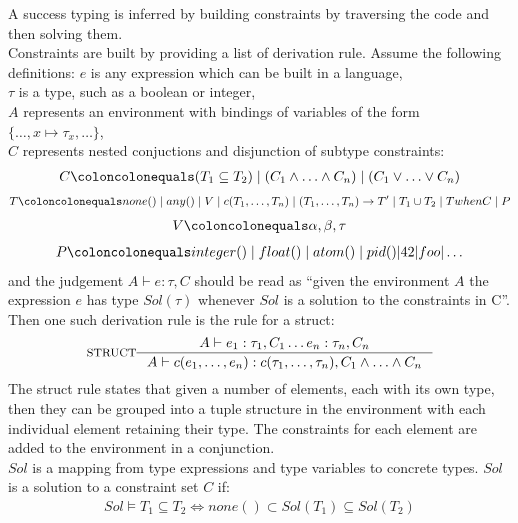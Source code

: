 \documentclass[12pt, titlepage]{article}
\begin{document}
A success typing is inferred by building constraints by traversing the code and then solving them. \\
Constraints are built by providing a list of derivation rule. Assume the following definitions:
$e$ is any expression which can be built in a language, \\
$\tau$ is a type, such as a boolean or integer, \\
$A$ represents an environment with bindings of variables of the form $\{\ldots, x \mapsto \tau_x, \ldots\}$, \\
$C$ represents nested conjuctions and disjunction of subtype constraints:
\begin{align*} 
	C \coloncolonequals (T_1 \subseteq T_2) \mid (C_1 \land \ldots \land C_n) \mid (C_1 \lor \ldots \lor C_n)
\end{align*}
\begin{align*} 
	T \coloncolonequals none() \mid any() \mid V \mid c(T_1, \ldots, T_n) \mid (T_1, \ldots, T_n) \rightarrow T'\mid T_1 \cup T_2 \mid T when C \mid P
\end{align*}
\begin{align*} 
	V \coloncolonequals \alpha, \beta, \tau
\end{align*}
\begin{align*} 
	P \coloncolonequals integer() \mid float() \mid atom() \mid pid()| 42 | foo | \ldots
\end{align*}
and the judgement $A \vdash e : \tau, C$ should be read as ``given the environment $A$ the expression $e$ has type $Sol(\tau)$ whenever $Sol$ is a solution to the constraints in C''. \\
Then one such derivation rule is the rule for a struct:
                \[
\inference*[STRUCT]{  A \vdash  e_1 : \tau_1, C_1 \ldots e_n : \tau_n, C_n}
                                        {A \vdash  c(e_1, \ldots, e_n) : c(\tau_1, \ldots, \tau_n), C_1 \land \ldots \land C_n}
                \]
The struct rule states that given a number of elements, each with its own type, then they can be grouped into a tuple structure in the environment with each individual element retaining their type. The constraints for each element are added to the environment in a conjunction. \\
$Sol$ is a mapping from type expressions and type variables to concrete types. $Sol$ is a solution to a constraint set $C$ if:
\begin{align*} 
	Sol \models T_1 \subseteq T_2 \iff none() \subset Sol(T_1) \subseteq Sol(T_2)
\end{align*}
\end{document}
